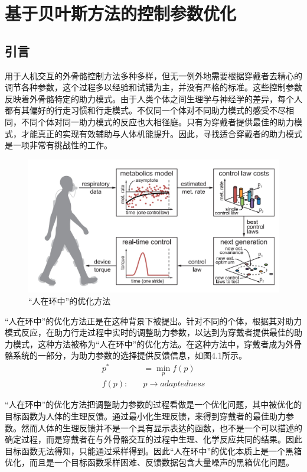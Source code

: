 \chapter{基于贝叶斯方法的控制参数优化}
\section{引言}

用于人机交互的外骨骼控制方法多种多样，但无一例外地需要根据穿戴者去精心的调节各种参数，这个过程多以经验和试错为主，并没有严格的标准。这些控制参数反映着外骨骼特定的助力模式。由于人类个体之间生理学与神经学的差异，每个人都有其偏好的行走习惯和行走模式。不仅同一个体对不同助力模式的感受不尽相同，不同个体对同一助力模式的反应也大相径庭。只有为穿戴者提供最佳的助力模式，才能真正的实现有效辅助与人体机能提升。因此，寻找适合穿戴者的助力模式是一项非常有挑战性的工作。

\begin{figure}[!htb]
    \includegraphics[width=15cm]{fig/f60.jpg}
    \caption{“人在环中”的优化方法\cite{p40}}
    \label{fig:mark}
\end{figure}

“人在环中”的优化方法正是在这种背景下被提出。针对不同的个体，根据其对助力模式反应，在助力行走过程中实时的调整助力参数，以达到为穿戴者提供最佳的助力模式，这种方法被称为“人在环中”的优化方法。在这种方法中，穿戴者成为外骨骼系统的一部分，为助力参数的选择提供反馈信息，如图4.1所示。
\begin{align}
    p^{*} & = \mathop{min}\limits_{p} f(p) \\
    f(p):\quad &p \to adaptedness
\end{align}

“人在环中”的优化方法把调整助力参数的过程看做是一个优化问题，其中被优化的目标函数为人体的生理反馈。通过最小化生理反馈，来得到穿戴者的最佳助力参数。然而人体的生理反馈并不是一个具有显示表达的函数，也不是一个可以描述的确定过程，而是穿戴者在与外骨骼交互的过程中生理、化学反应共同的结果。因此目标函数无法得知，只能通过采样得到。因此“人在环中”的优化本质上是一个黑箱优化，而且是一个目标函数采样困难、反馈数据包含大量噪声的黑箱优化问题。

